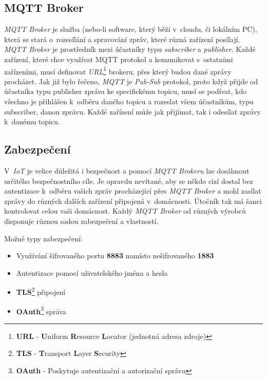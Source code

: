 \subsection*{MQTT Broker}
\emph{MQTT Broker} je služba (nebo-li software, který běži v~cloudu, či lokálním PC), která se stará o~rozesílání a spravování zpráv, které různá zařízení posílají.
\emph{MQTT Broker} je prostředník mezi účastníky typu \emph{subscriber} a \emph{publisher}.
Každé zařízení, které chce využívat MQTT protokol a komunikovat s~ostatními zařízeními, musí definovat \emph{URL}\footnote{\textbf{URL} - \textbf{U}niform \textbf{R}esource \textbf{L}ocator (jednotná adresa zdroje)} brokeru, přes který budou dané zprávy procházet.
Jak již bylo řečeno, \emph{MQTT} je \emph{Pub-Sub} protokol, proto když přijde od účastníka typu publisher zpráva ke specifickému topicu, musí se podívat, kdo všechno je přihlášen k~odběru daného topicu a rozeslat všem účastníkům, typu subscriber, danou zprávu.
Každé zařízení může jak přijímat, tak i odesílat zprávy k~danému topicu.~\cite{wiki:mqtt_broker}

\subsection*{Zabezpečení}
V~\emph{IoT} je velice důležitá i bezpečnost a pomocí \emph{MQTT Brokeru} lze dosáhnout určitého bezpečnostního cíle. Je opravdu nevítané, aby se někdo cizí dostal bez autentizace k~odběru vašich
zpráv procházející přes \emph{MQTT Broker} a mohl zasílat zprávy do různých dalších zařízení připojená v~domácnosti.
Útočník tak má šanci kontrolovat celou vaši domácnost. Každý \emph{MQTT Broker} od různých výrobců disponuje různou sadou zabezpečení a vlastností.~\cite{wiki:mqtt_broker}
\newline

Možné typy zabezpečení:
\begin{itemize}
  \item Využívání šifrovaného portu \textbf{8883} namísto nešifrovaného \textbf{1883}
  \item Autentizace pomocí uživatelského jména a hesla
  \item \textbf{TLS}\footnote{\textbf{TLS} - \textbf{T}ransport \textbf{L}ayer \textbf{S}ecurity} připojení
  \item \textbf{OAuth}\footnote{\textbf{OAuth} - Poskytuje autentizační a autorizační správu} správa
\end{itemize}

\newpage

